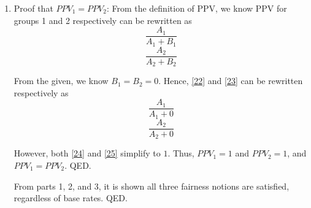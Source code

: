 \documentclass{cisXXX} %
\begin{document}
\begin{enumerate}
\item Proof that $PPV_1 = PPV_2$:
From the definition of PPV, we know PPV for groups 1 and 2 respectively can be rewritten as
\begin{equation}
\label{22} \frac{A_1}{A_1 + B_1}
\end{equation}
\begin{equation}
\label{23} \frac{A_2}{A_2 + B_2}
\end{equation}

From the given, we know $B_1 = B_2 = 0$. Hence, \eqref{22} and \eqref{23} can be rewritten respectively as
\begin{equation}
\label{24} \frac{A_1}{A_1 + 0}
\end{equation}
\begin{equation}
\label{25} \frac{A_2}{A_2 + 0}
\end{equation}

However, both \eqref{24} and \eqref{25} simplify to $1$. Thus, $PPV_1 = 1$ and $PPV_2 = 1$, and $PPV_1 = PPV_2$. QED.

From parts 1, 2, and 3, it is shown all three fairness notions are satisfied, regardless of base rates. QED.
\end{enumerate}
\end{document}

